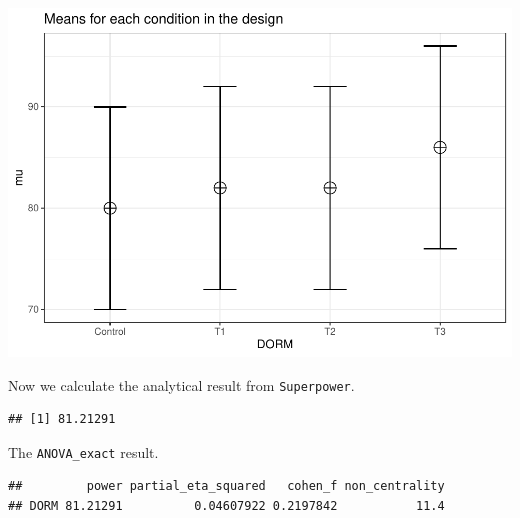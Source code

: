 \documentclass[
]{book}
\newenvironment{Shaded}{\begin{snugshade}}{\end{snugshade}}
\newcommand{\DataTypeTok}[1]{\textcolor[rgb]{0.13,0.29,0.53}{#1}}
\newcommand{\KeywordTok}[1]{\textcolor[rgb]{0.13,0.29,0.53}{\textbf{#1}}}
\newcommand{\NormalTok}[1]{#1}
\newcommand{\OperatorTok}[1]{\textcolor[rgb]{0.81,0.36,0.00}{\textbf{#1}}}
\newcommand{\OtherTok}[1]{\textcolor[rgb]{0.56,0.35,0.01}{#1}}
\newcommand{\StringTok}[1]{\textcolor[rgb]{0.31,0.60,0.02}{#1}}
\begin{document}
\includegraphics{SuperpowerValidation_files/figure-latex/aberson_appendix-1.pdf}

Now we calculate the analytical result from \texttt{Superpower}.

\begin{Shaded}
\end{Shaded}

\begin{verbatim}
## [1] 81.21291
\end{verbatim}

The \texttt{ANOVA\_exact} result.

\begin{Shaded}
\end{Shaded}

\begin{verbatim}
##         power partial_eta_squared   cohen_f non_centrality
## DORM 81.21291          0.04607922 0.2197842           11.4
\end{verbatim}
\end{document}
